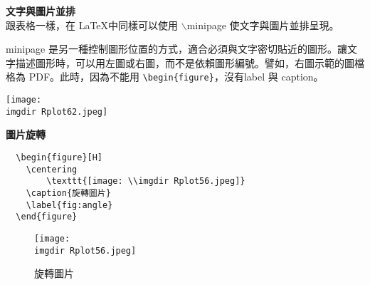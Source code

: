 \textbf{文字與圖片並排}\\
跟表格一樣，在 \LaTeX 中同樣可以使用 {\A $\backslash$minipage} 使文字與圖片並排呈現。

\begin{minipage}{.4\linewidth}
{\A minipage} 是另一種控制圖形位置的方式，適合必須與文字密切貼近的圖形。讓文字描述圖形時，可以用左圖或右圖，而不是依賴圖形編號。譬如，右圖示範的圖檔格為 PDF。此時，因為不能用 \verb|\begin{figure}|，沒有{\A label} 與  {\A caption}。

\end{minipage}
\begin{minipage}{.6\linewidth}
    \texttt{[image: \\imgdir Rplot62.jpeg]}
\end{minipage}

\textbf{圖片旋轉}

\bigskip
\begin{lstlisting}
  \begin{figure}[H]
    \centering
        \texttt{[image: \\imgdir Rplot56.jpeg]}
    \caption{旋轉圖片}
    \label{fig:angle}
  \end{figure}
\end{lstlisting}

\begin{figure}[H]
    \centering
        \texttt{[image: \\imgdir Rplot56.jpeg]}
    \caption{旋轉圖片}
    \label{fig:angle}
\end{figure}








